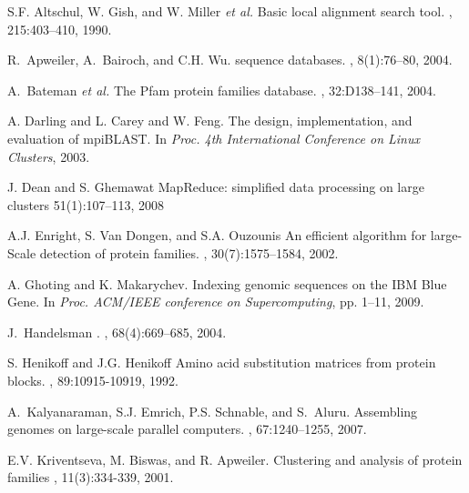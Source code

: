\documentclass[10pt,journal,letterpaper,compsoc]{IEEEtran}
\begin{document}
\begin{thebibliography}{1}

S.F. Altschul, W. Gish, and W. Miller {\it et al.}
\newblock Basic local alignment search tool.
, 215:403--410, 1990.

R.~Apweiler, A.~Bairoch, and C.H. Wu.
 sequence databases.
, 8(1):76--80, 2004.


A.~Bateman {\it et al.}
\newblock The {Pfam} protein families database.
, 32:D138--141, 2004.

A. Darling and L. Carey and W. Feng.
\newblock The design, implementation, and evaluation of mpiBLAST.
\newblock In {\em Proc. 4th International Conference on Linux Clusters}, 2003.

J. Dean and S. Ghemawat
\newblock MapReduce: simplified data processing on large clusters
51(1):107--113, 2008

A.J. Enright, S. Van Dongen, and S.A. Ouzounis
\newblock An efficient algorithm for large-Scale detection of protein families.
, 30(7):1575--1584, 2002.


A. Ghoting and K. Makarychev.
\newblock Indexing genomic sequences on the IBM Blue Gene.
\newblock In {\em Proc. ACM/IEEE conference on Supercomputing}, pp. 1--11, 2009.

J.~Handelsman
.
, 68(4):669--685, 2004.


S. Henikoff and J.G. Henikoff
\newblock Amino acid substitution matrices from protein blocks.
, 89:10915-10919, 1992.


A.~Kalyanaraman, S.J. Emrich, P.S. Schnable, and S.~Aluru.
\newblock Assembling genomes on large-scale parallel computers.
,
  67:1240--1255, 2007.

E.V. Kriventseva, M. Biswas, and R. Apweiler.
\newblock Clustering and analysis of protein families
, 11(3):334-339, 2001.



\end{thebibliography}
\end{document}

